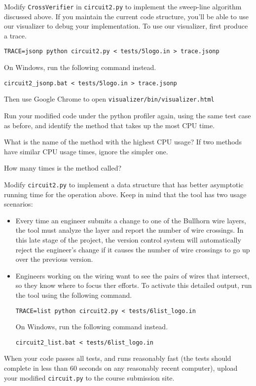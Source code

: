 \documentclass[12pt,twoside]{article}
\begin{document}
\begin{problems}
Modify \texttt{CrossVerifier} in \texttt{circuit2.py} to implement the
sweep-line algorithm discussed above. If you maintain the current code
structure, you'll be able to use our visualizer to debug your implementation. To
use our visualizer, first produce a trace.

\texttt{TRACE=jsonp python circuit2.py < tests/5logo.in > trace.jsonp}

On Windows, run the following command instead.

\texttt{circuit2\_jsonp.bat < tests/5logo.in > trace.jsonp}

Then use Google Chrome to open \texttt{visualizer/bin/visualizer.html}

\begin{problemparts}
\problempart {} Run your modified code under the python profiler again,
using the same test case as before, and identify the method that takes up the
most CPU time.

What is the name of the method with the highest CPU usage? If two methods have
similar CPU usage times, ignore the simpler one.

\problempart {} How many times is the method called?

\problempart {} Modify \texttt{circuit2.py} to implement a data
structure that has better asymptotic running time for the operation above. Keep
in mind that the tool has two usage scenarios:

\begin{itemize}
  \item Every time an engineer submits a change to one of the Bullhorn wire
  layers, the tool must analyze the layer and report the number of wire
  crossings. In this late stage of the project, the version control system will
  automatically reject the engineer's change if it causes the number of wire
  crossings to go up over the previous version.
  \item Engineers working on the wiring want to see the pairs of wires that
  intersect, so they know where to focus ther efforts. To activate this detailed
  output, run the tool using the following command.

  \texttt{TRACE=list python circuit2.py < tests/6list\_logo.in}
  
  On Windows, run the following command instead.
  
  \texttt{circuit2\_list.bat < tests/6list\_logo.in}
\end{itemize}

When your code passes all tests, and runs reasonably fast (the tests should
complete in less than 60 seconds on any reasonably recent computer), upload your
modified \texttt{circuit.py} to the course submission site.

\end{problemparts}

\end{problems}
\end{document}
